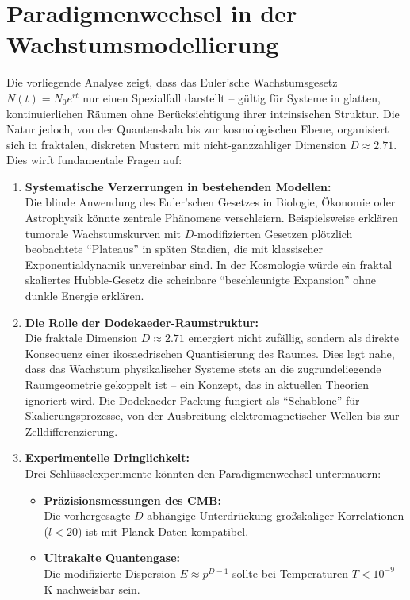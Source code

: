 \section{Paradigmenwechsel in der Wachstumsmodellierung}
Die vorliegende Analyse zeigt, dass das Euler'sche Wachstumsgesetz $N(t)=N_0e^{rt}$ nur einen Spezialfall darstellt – gültig für Systeme in glatten, kontinuierlichen Räumen
ohne Berücksichtigung ihrer intrinsischen Struktur. Die Natur jedoch, von der Quantenskala bis zur kosmologischen Ebene, organisiert sich in fraktalen, diskreten Mustern mit
nicht-ganzzahliger Dimension $D \approx 2.71$. Dies wirft fundamentale Fragen auf:
\begin{enumerate}
    \item \textbf{Systematische Verzerrungen in bestehenden Modellen:}\\Die blinde Anwendung des Euler'schen Gesetzes in Biologie, Ökonomie oder Astrophysik könnte zentrale Phänomene verschleiern. Beispielsweise erklären tumorale Wachstumskurven mit $D$-modifizierten Gesetzen plötzlich beobachtete \enquote{Plateaus} in späten Stadien, die mit klassischer Exponentialdynamik unvereinbar sind. In der Kosmologie würde ein fraktal skaliertes Hubble-Gesetz die scheinbare \enquote{beschleunigte Expansion} ohne dunkle Energie erklären.
    \item \textbf{Die Rolle der Dodekaeder-Raumstruktur:}\\Die fraktale Dimension $D\approx2.71$ emergiert nicht zufällig, sondern als direkte Konsequenz einer ikosaedrischen Quantisierung des Raumes. Dies legt nahe, dass das Wachstum physikalischer Systeme stets an die zugrundeliegende Raumgeometrie gekoppelt ist – ein Konzept, das in aktuellen Theorien ignoriert wird. Die Dodekaeder-Packung fungiert als \enquote{Schablone} für Skalierungsprozesse, von der Ausbreitung elektromagnetischer Wellen bis zur Zelldifferenzierung.
    \item \textbf{Experimentelle Dringlichkeit:}\\Drei Schlüsselexperimente könnten den Paradigmenwechsel untermauern:
    \begin{itemize}
        \item \textbf{Präzisionsmessungen des CMB:}\\Die vorhergesagte $D$-abhängige Unterdrückung großskaliger Korrelationen ($l < 20$) ist mit Planck-Daten kompatibel.
        \item \textbf{Ultrakalte Quantengase:}\\Die modifizierte Dispersion $E \approx p^{D-1}$ sollte bei Temperaturen $T < 10^{-9}$ K nachweisbar sein.

\end{itemize}
\end{enumerate}
